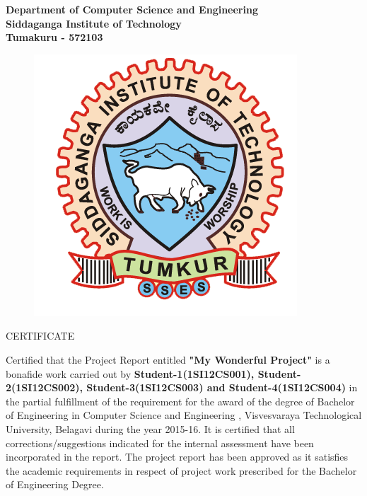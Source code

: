 \begin{center}
\bfseries
\large{Department of Computer Science and Engineering\\
Siddaganga Institute of Technology \\
Tumakuru - 572103} \\
\begin{figure}[hbtp]
\centering
\includegraphics[scale=1]{../ThesisFigs/College_logo.png}
\end{figure}

\LARGE{CERTIFICATE} \\
\end{center}
\small{
Certified that the Project Report entitled \textbf{"My Wonderful Project"} is a bonafide work carried out by \textbf{Student-1(1SI12CS001), Student-2(1SI12CS002), Student-3(1SI12CS003) and Student-4(1SI12CS004)} in the partial fulfillment of the requirement for the award of the degree of Bachelor of Engineering in Computer Science and Engineering , Visvesvaraya Technological University, Belagavi during the year 2015-16. It is certified that all corrections/suggestions indicated for the internal assessment have been incorporated in the report. The project report has been approved as it satisfies the academic requirements in respect of project work prescribed for the Bachelor of Engineering Degree.} \\

